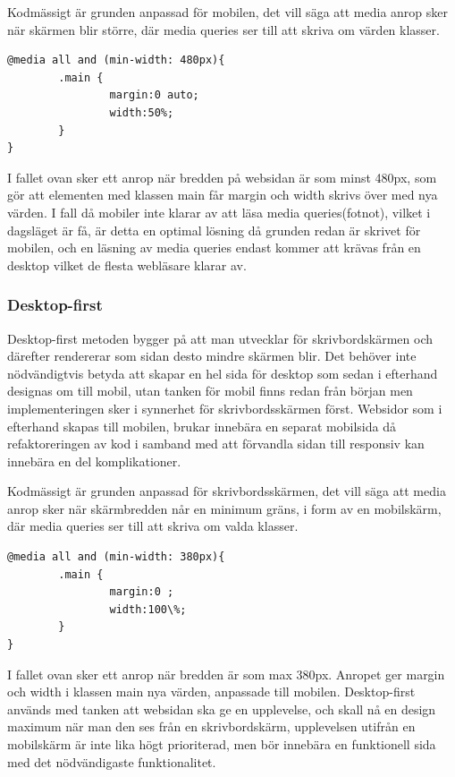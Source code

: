 \documentclass[11pt]{article}
\begin{document}
Kodmässigt är grunden anpassad för mobilen, det vill säga att media anrop sker när skärmen blir större, där media queries ser till att skriva om värden klasser. 
\vspace{0.5cm}
 \begin{verbatim}
@media all and (min-width: 480px){
        .main {
                margin:0 auto;
                width:50%;
        }
}
\end{verbatim}

\vspace{0.5cm}
I fallet ovan sker ett anrop när bredden på websidan är som minst 480px, som gör att elementen med klassen main får margin och width skrivs över med nya värden. I fall då mobiler inte klarar av att läsa media queries(fotnot), vilket i dagsläget är få, är detta en optimal lösning då grunden redan är skrivet för mobilen, och en läsning av media queries endast kommer att krävas från en desktop vilket de flesta webläsare klarar av.

\subsubsection{Desktop-first}
Desktop-first metoden bygger på att man utvecklar för skrivbordskärmen och därefter rendererar som sidan desto mindre skärmen blir. Det behöver inte nödvändigtvis betyda att skapar en hel sida för desktop som sedan i efterhand designas om till mobil, utan tanken för mobil finns redan från början men implementeringen sker i synnerhet för skrivbordsskärmen först. Websidor som i efterhand skapas till mobilen, brukar innebära en separat mobilsida då refaktoreringen av kod i samband med att förvandla sidan till responsiv kan innebära en del komplikationer.  

Kodmässigt är grunden anpassad för skrivbordsskärmen, det vill säga att media anrop sker när skärmbredden når en minimum gräns, i form av en mobilskärm, där media queries ser till att skriva om valda klasser.


\vspace{0.5cm}
 \begin{verbatim}
@media all and (min-width: 380px){
        .main {
                margin:0 ;
                width:100\%;
        }
}
\end{verbatim}
\vspace{0.5cm}

I fallet ovan sker ett anrop när bredden är som max 380px. Anropet ger margin och width i klassen main nya värden, anpassade till mobilen.  Desktop-first används med tanken att websidan ska ge en upplevelse, och skall nå en design maximum när man den ses från en skrivbordskärm, upplevelsen utifrån en mobilskärm är inte lika högt prioriterad, men bör innebära en funktionell sida med det nödvändigaste funktionalitet.
\end{document}
